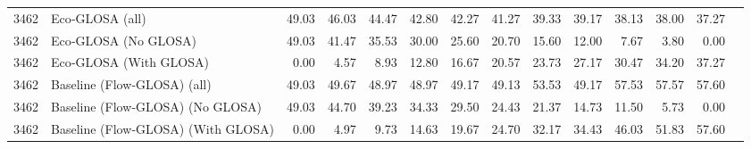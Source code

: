 \begin{table}[ht]
{\begin{tabular}{llrrrrrrrrrrrr}
      \midrule
      3462 & Eco‐GLOSA (all)                   & 49.03 & 46.03 & 44.47 & 42.80 & 42.27 & 41.27 & 39.33 & 39.17 & 38.13 & 38.00 & 37.27 \\
      3462 & Eco‐GLOSA (No GLOSA)              & 49.03 & 41.47 & 35.53 & 30.00 & 25.60 & 20.70 & 15.60 & 12.00 &  7.67 &  3.80 &  0.00 \\
      3462 & Eco‐GLOSA (With GLOSA)            &  0.00 &  4.57 &  8.93 & 12.80 & 16.67 & 20.57 & 23.73 & 27.17 & 30.47 & 34.20 & 37.27 \\
      3462 & Baseline (Flow‐GLOSA) (all)       & 49.03 & 49.67 & 48.97 & 48.97 & 49.17 & 49.13 & 53.53 & 49.17 & 57.53 & 57.57 & 57.60 \\
      3462 & Baseline (Flow‐GLOSA) (No GLOSA)  & 49.03 & 44.70 & 39.23 & 34.33 & 29.50 & 24.43 & 21.37 & 14.73 & 11.50 &  5.73 &  0.00 \\
      3462 & Baseline (Flow‐GLOSA) (With GLOSA)&  0.00 &  4.97 &  9.73 & 14.63 & 19.67 & 24.70 & 32.17 & 34.43 & 46.03 & 51.83 & 57.60 \\
      \bottomrule
    \end{tabular}%
  }
\end{table}

